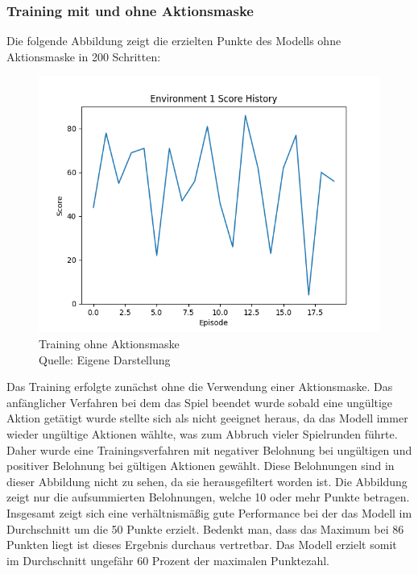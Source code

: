 \subsubsection{Training mit und ohne Aktionsmaske}
Die folgende Abbildung zeigt die erzielten Punkte des Modells ohne Aktionsmaske in 200 Schritten:
\nopagebreak
\begin{figure}[H]
	\includegraphics[width=1\textwidth]{Bilder/trainingwithoutcancalation} 
	\caption[Training ohne Aktionsmaske]{Training ohne Aktionsmaske\\ Quelle: Eigene Darstellung}
\end{figure}

Das Training erfolgte zunächst ohne die Verwendung einer Aktionsmaske. Das anfänglicher Verfahren bei dem das Spiel beendet wurde sobald eine ungültige Aktion getätigt wurde stellte sich als nicht geeignet heraus, da das Modell immer wieder ungültige Aktionen wählte, was zum Abbruch vieler Spielrunden führte. Daher wurde eine Trainingsverfahren mit negativer Belohnung bei ungültigen und positiver Belohnung bei gültigen Aktionen gewählt. Diese Belohnungen sind in dieser Abbildung nicht zu sehen, da sie herausgefiltert worden ist. Die Abbildung zeigt nur die aufsummierten Belohnungen, welche 10 oder mehr Punkte betragen. Insgesamt zeigt sich eine verhältnismäßig gute Performance bei der das Modell im Durchschnitt um die 50 Punkte erzielt. Bedenkt man, dass das Maximum bei 86 Punkten liegt ist dieses Ergebnis durchaus vertretbar. Das Modell erzielt somit im Durchschnitt ungefähr 60 Prozent der maximalen Punktezahl.\\

